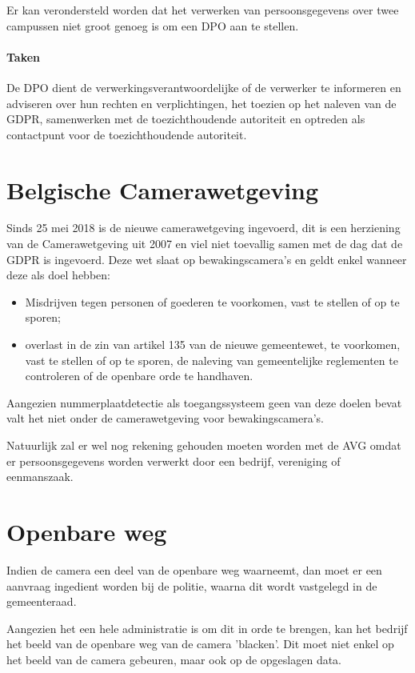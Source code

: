 Er kan verondersteld worden dat het verwerken van persoonsgegevens over twee campussen niet groot genoeg is om een DPO aan te stellen.

\paragraph{Taken}
De DPO dient de verwerkingsverantwoordelijke of de verwerker te informeren en adviseren over hun rechten en verplichtingen, het toezien op het naleven van de GDPR, samenwerken met de toezichthoudende autoriteit en optreden als contactpunt voor de toezichthoudende autoriteit.


\section{Belgische Camerawetgeving}
Sinds 25 mei 2018 is de nieuwe camerawetgeving ingevoerd, dit is een herziening van de Camerawetgeving uit 2007 en viel niet toevallig samen met de dag dat de GDPR is ingevoerd. Deze wet slaat op bewakingscamera's en geldt enkel wanneer deze als doel hebben:
\begin{itemize}
	\item Misdrijven tegen personen of goederen te voorkomen, vast te stellen of op te sporen;
	\item overlast in de zin van artikel 135 van de nieuwe gemeentewet, te voorkomen, vast te stellen of op te sporen, de naleving van gemeentelijke reglementen te controleren of de openbare orde te handhaven.
\end{itemize}
Aangezien nummerplaatdetectie als toegangssysteem geen van deze doelen bevat valt het niet onder de camerawetgeving voor bewakingscamera's. \autocite{staatsblad2007wet}

Natuurlijk zal er wel nog rekening gehouden moeten worden met de AVG omdat er persoonsgegevens worden verwerkt door een bedrijf, vereniging of eenmanszaak. \autocite{gba2019videoparlofoon}

\section{Openbare weg}
Indien de camera een deel van de openbare weg waarneemt, dan moet er een aanvraag ingedient worden bij de politie, waarna dit wordt vastgelegd in de gemeenteraad. \autocite{beltug2018camerawet}

Aangezien het een hele administratie is om dit in orde te brengen, kan het bedrijf het beeld van de openbare weg van de camera 'blacken'. Dit moet niet enkel op het beeld van de camera gebeuren, maar ook op de opgeslagen data. \autocite{beltug2018camerawet}

